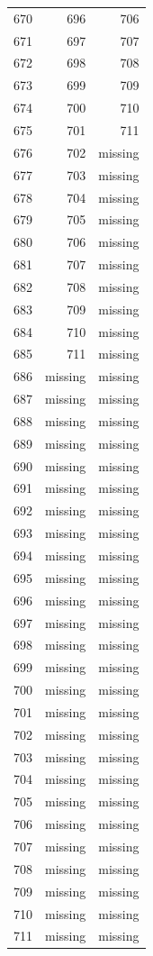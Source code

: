 \begin{tabular}{rrr}
  670 & 696 & 706 \\
  671 & 697 & 707 \\
  672 & 698 & 708 \\
  673 & 699 & 709 \\
  674 & 700 & 710 \\
  675 & 701 & 711 \\
  676 & 702 & missing \\
  677 & 703 & missing \\
  678 & 704 & missing \\
  679 & 705 & missing \\
  680 & 706 & missing \\
  681 & 707 & missing \\
  682 & 708 & missing \\
  683 & 709 & missing \\
  684 & 710 & missing \\
  685 & 711 & missing \\
  686 & missing & missing \\
  687 & missing & missing \\
  688 & missing & missing \\
  689 & missing & missing \\
  690 & missing & missing \\
  691 & missing & missing \\
  692 & missing & missing \\
  693 & missing & missing \\
  694 & missing & missing \\
  695 & missing & missing \\
  696 & missing & missing \\
  697 & missing & missing \\
  698 & missing & missing \\
  699 & missing & missing \\
  700 & missing & missing \\
  701 & missing & missing \\
  702 & missing & missing \\
  703 & missing & missing \\
  704 & missing & missing \\
  705 & missing & missing \\
  706 & missing & missing \\
  707 & missing & missing \\
  708 & missing & missing \\
  709 & missing & missing \\
  710 & missing & missing \\
  711 & missing & missing \\\hline
\end{tabular}
